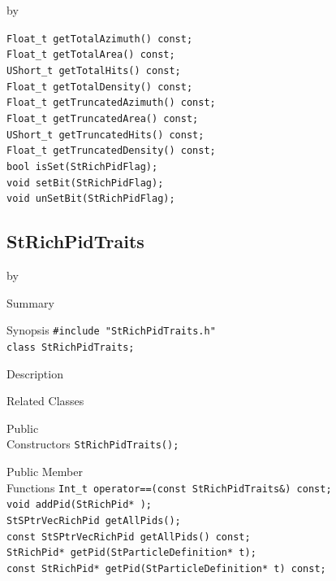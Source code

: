 \documentclass[twoside]{article}
\newcommand{\entrylabel}[1]{\mbox{\textbf{{#1}}}\hfil}%
\newenvironment{entry}
{\begin{list}{}%
    {\renewcommand{\makelabel}{\entrylabel}%
     \setlength{\labelwidth}{90pt}%
     \setlength{\leftmargin}{\labelwidth}
     \advance\leftmargin by \labelsep%
      }%
    }%
  {\end{list}}
\newcommand{\Entrylabel}[1]%
{\raisebox{0pt}[1ex][0pt]{\makebox[\labelwidth][l]%
    {\parbox[t]{\labelwidth}{\hspace{0pt}\textbf{{#1}}}}}}
\newenvironment{Entry}%
{\renewcommand{\entrylabel}{\Entrylabel}\begin{entry}}%
  {\end{entry}}
\begin{document}
\begin{Entry}
    \verb+Float_t getTotalAzimuth() const;+\\
    \verb+Float_t getTotalArea() const;+\\
    \verb+UShort_t getTotalHits() const;+\\
    \verb+Float_t getTotalDensity() const;+\\
    \verb+Float_t getTruncatedAzimuth() const;+\\
    \verb+Float_t getTruncatedArea() const;+\\
    \verb+UShort_t getTruncatedHits() const;+\\
    \verb+Float_t getTruncatedDensity() const;+\\
    \verb+bool isSet(StRichPidFlag);+\\
    \verb+void setBit(StRichPidFlag);+\\
    \verb+void unSetBit(StRichPidFlag);+\\
\end{Entry}
\clearpage

\subsection{StRichPidTraits}
\label{sec:StRichPidTraits}
\begin{Entry}
\item[Summary]
\item[Synopsis]
    \verb+#include "StRichPidTraits.h"+\\
    \verb+class StRichPidTraits;+\\
\item[Description]
\item[Related Classes]
\item[Public\\ Constructors]
    \verb+StRichPidTraits();+\\
\item[Public Member\\ Functions]
    \verb+Int_t operator==(const StRichPidTraits&) const;+\\
    \verb+void addPid(StRichPid* );+\\
    \verb+StSPtrVecRichPid getAllPids();+\\
    \verb+const StSPtrVecRichPid getAllPids() const;+\\
    \verb+StRichPid* getPid(StParticleDefinition* t);+\\
    \verb+const StRichPid* getPid(StParticleDefinition* t) const;+\\
\end{Entry}
\clearpage
\end{document}
